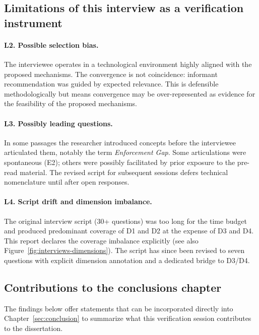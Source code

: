\subsection*{Limitations of this interview as a verification instrument}

\paragraph*{L2. Possible selection bias.} The interviewee operates in a technological environment highly aligned with the proposed mechanisms. The convergence is not coincidence: informant recommendation was guided by expected relevance. This is defensible methodologically but means convergence may be over-represented as evidence for the feasibility of the proposed mechanisms.

\paragraph*{L3. Possibly leading questions.} In some passages the researcher introduced concepts before the interviewee articulated them, notably the term \emph{Enforcement Gap}. Some articulations were spontaneous (E2); others were possibly facilitated by prior exposure to the pre-read material. The revised script for subsequent sessions defers technical nomenclature until after open responses.

\paragraph*{L4. Script drift and dimension imbalance.} The original interview script (30+ questions) was too long for the time budget and produced predominant coverage of D1 and D2 at the expense of D3 and D4. This report declares the coverage imbalance explicitly (see also Figure~\ref{fig:interviews-dimensions}). The script has since been revised to seven questions with explicit dimension annotation and a dedicated bridge to D3/D4.

\subsection*{Contributions to the conclusions chapter}

The findings below offer statements that can be incorporated directly into Chapter~\ref{sec:conclusion} to summarize what this verification session contributes to the dissertation.

